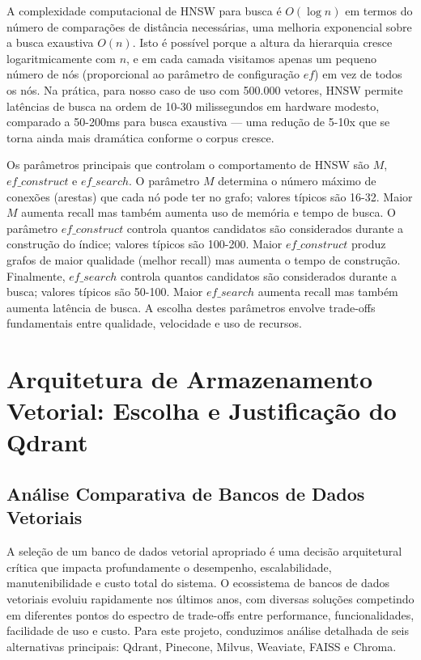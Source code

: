 \documentclass[12pt,a4paper]{article}
\begin{document}
A complexidade computacional de HNSW para busca é $O(\log n)$ em termos do número de comparações de distância necessárias, uma melhoria exponencial sobre a busca exaustiva $O(n)$. Isto é possível porque a altura da hierarquia cresce logaritmicamente com $n$, e em cada camada visitamos apenas um pequeno número de nós (proporcional ao parâmetro de configuração $ef$) em vez de todos os nós. Na prática, para nosso caso de uso com 500.000 vetores, HNSW permite latências de busca na ordem de 10-30 milissegundos em hardware modesto, comparado a 50-200ms para busca exaustiva — uma redução de 5-10x que se torna ainda mais dramática conforme o corpus cresce.

Os parâmetros principais que controlam o comportamento de HNSW são $M$, $ef\_construct$ e $ef\_search$. O parâmetro $M$ determina o número máximo de conexões (arestas) que cada nó pode ter no grafo; valores típicos são 16-32. Maior $M$ aumenta recall mas também aumenta uso de memória e tempo de busca. O parâmetro $ef\_construct$ controla quantos candidatos são considerados durante a construção do índice; valores típicos são 100-200. Maior $ef\_construct$ produz grafos de maior qualidade (melhor recall) mas aumenta o tempo de construção. Finalmente, $ef\_search$ controla quantos candidatos são considerados durante a busca; valores típicos são 50-100. Maior $ef\_search$ aumenta recall mas também aumenta latência de busca. A escolha destes parâmetros envolve trade-offs fundamentais entre qualidade, velocidade e uso de recursos.

\section{Arquitetura de Armazenamento Vetorial: Escolha e Justificação do Qdrant}

\subsection{Análise Comparativa de Bancos de Dados Vetoriais}

A seleção de um banco de dados vetorial apropriado é uma decisão arquitetural crítica que impacta profundamente o desempenho, escalabilidade, manutenibilidade e custo total do sistema. O ecossistema de bancos de dados vetoriais evoluiu rapidamente nos últimos anos, com diversas soluções competindo em diferentes pontos do espectro de trade-offs entre performance, funcionalidades, facilidade de uso e custo. Para este projeto, conduzimos análise detalhada de seis alternativas principais: Qdrant, Pinecone, Milvus, Weaviate, FAISS e Chroma.
\end{document}

